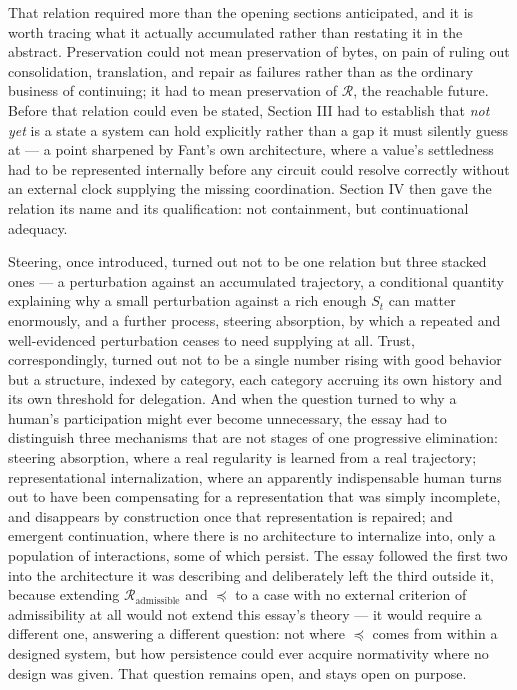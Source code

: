 \documentclass[11pt]{article}
\newcommand{\adm}{\mathrm{admissible}}
\begin{document}
That relation required more than the opening sections anticipated, and it is worth tracing what it actually accumulated rather than restating it in the abstract. Preservation could not mean preservation of bytes, on pain of ruling out consolidation, translation, and repair as failures rather than as the ordinary business of continuing; it had to mean preservation of $\mathcal{R}$, the reachable future. Before that relation could even be stated, Section III had to establish that \emph{not yet} is a state a system can hold explicitly rather than a gap it must silently guess at --- a point sharpened by Fant's own architecture, where a value's settledness had to be represented internally before any circuit could resolve correctly without an external clock supplying the missing coordination. Section IV then gave the relation its name and its qualification: not containment, but continuational adequacy.

Steering, once introduced, turned out not to be one relation but three stacked ones --- a perturbation against an accumulated trajectory, a conditional quantity explaining why a small perturbation against a rich enough $S_t$ can matter enormously, and a further process, steering absorption, by which a repeated and well-evidenced perturbation ceases to need supplying at all. Trust, correspondingly, turned out not to be a single number rising with good behavior but a structure, indexed by category, each category accruing its own history and its own threshold for delegation. And when the question turned to why a human's participation might ever become unnecessary, the essay had to distinguish three mechanisms that are not stages of one progressive elimination: steering absorption, where a real regularity is learned from a real trajectory; representational internalization, where an apparently indispensable human turns out to have been compensating for a representation that was simply incomplete, and disappears by construction once that representation is repaired; and emergent continuation, where there is no architecture to internalize into, only a population of interactions, some of which persist. The essay followed the first two into the architecture it was describing and deliberately left the third outside it, because extending $\mathcal{R}_\adm$ and $\preceq$ to a case with no external criterion of admissibility at all would not extend this essay's theory --- it would require a different one, answering a different question: not where $\preceq$ comes from within a designed system, but how persistence could ever acquire normativity where no design was given. That question remains open, and stays open on purpose.
\end{document}
